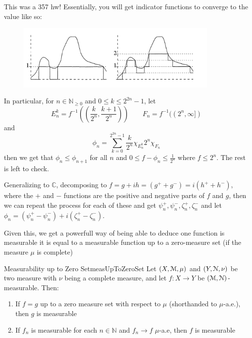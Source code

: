\documentclass[oneside]{book}
\newcommand{\N}{\mathbb{N}}
\renewcommand{\C}{\mathbb{C}}
\newcommand{\EM}{\EuScript{M}}
\newcommand{\EN}{\EuScript{N}}
\newcommand{\rw}{\rightarrow}
\begin{document}
\begin{Proof}
	This was a 357 hw! Essentially, you will get indicator functions to converge to the value like so:
	\begin{figure}[h]
		\centering
		\includegraphics[width=10cm]{indicatorApprox}
	\end{figure}
	In particular, for $n \in \N_{\ge 0}$ and $0 \le k \le 2^{2n}-1$, let
	\[
		E_n^k  = f^{-1}\left( \left(\frac{k}{2^n}, \frac{k+1}{2^n}\right)\right) \qquad F_n = f^{-1}((2^n, \infty])
	\]
	and
	\[
		\phi_n = \sum_{k=0}^{2^{2n}-1} \frac{k}{2^n} \chi_{E_n^k} 2^n\chi_{F_n}
	\]
	then we get that $\phi_n \le \phi_{n+1}$ for all $n$ and $0 \le f-\phi_n \le \frac{1}{2^n}$ where $f\le 2^n$. The
	rest is left to check. 

	Generalizing to $\C$, decomposing to $f = g + ih = (g^+ + g^-) = i(h^+ + h^-)$, where the $+$ and $-$ functions are
	the positive and negative parts of $f$ and $g$, then we can repeat the process for each of these and get $\psi_n^+,
	\psi_n^-, \zeta_n^+, \zeta_n^-$ and let $\phi_n = (\psi_n^+ - \psi_n^-) + i(\zeta_n^+ - \zeta_n^-)$. 
\end{Proof}

Given this, we get a powerfull way of being able to deduce one function is measurable it is equal to a measurable
function up to a zero-measure set (if the measure $\mu$ is complete)

\begin{prop}{Measurability up to Zero Set}{measUpToZeroSet}
	Let $(X, \EM, \mu)$ and $(Y, \EN, \nu)$ be two measure with $\nu$ being a complete measure, and let $f: X \rw Y$ be
	$(\EM, \EN)$-measurable. Then:
	\begin{enumerate}
		\item If $f = g$ up to a zero measure set with respect to $\mu$ (shorthanded to $\mu$-a.e.), then $g$ is measurable
		\item If $f_n$ is measurable for each $n \in \N$ and $f_n \rw f$ $\mu$-a.e, then $f$ is measurable
	\end{enumerate}
\end{prop}
\end{document}
